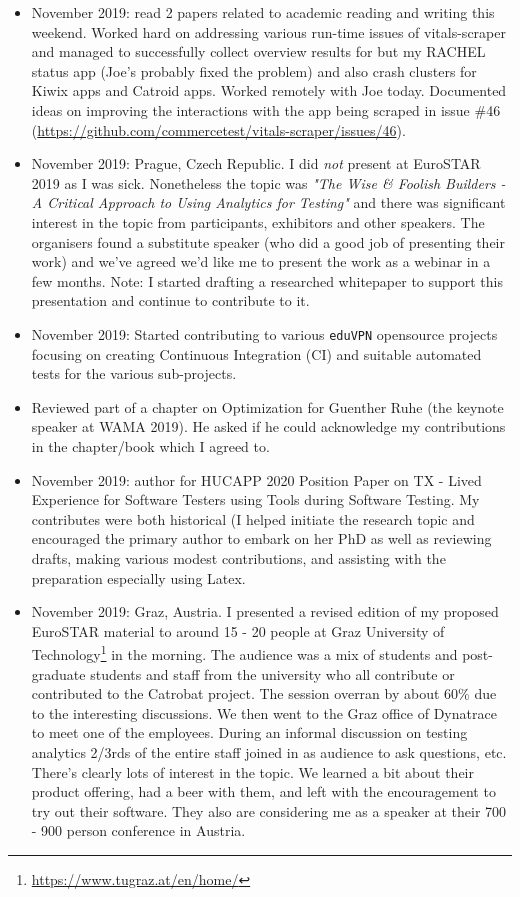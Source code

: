 \begin{itemize}
    \item {} November 2019: read 2 papers related to academic reading and writing this weekend. Worked hard on addressing various run-time issues of vitals-scraper and managed to successfully collect overview results for but my RACHEL status app (Joe's probably fixed the problem) and also crash clusters for Kiwix apps and Catroid apps. Worked remotely with Joe today. Documented ideas on improving the interactions with the app being scraped in issue \#46 (\url{https://github.com/commercetest/vitals-scraper/issues/46}).
    \item {} November 2019: Prague, Czech Republic. I did \emph{not} present at EuroSTAR 2019 as I was sick. Nonetheless the topic was \emph{"The Wise \& Foolish Builders - A Critical Approach to Using Analytics for Testing"} and there was significant interest in the topic from participants, exhibitors and other speakers. The organisers found a substitute speaker (who did a good job of presenting their work) and we've agreed we'd like me to present the work as a webinar in a few months. Note: I started drafting a researched whitepaper to support this presentation and continue to contribute to it.
    \item November 2019: Started contributing to various \texttt{eduVPN} opensource projects focusing on creating Continuous Integration (CI) and suitable automated tests for the various sub-projects. 
    \item Reviewed part of a chapter on Optimization for Guenther Ruhe (the keynote speaker at WAMA 2019). He asked if he could acknowledge my contributions in the chapter/book which I agreed to.
    \item November 2019:  author for HUCAPP 2020 Position Paper on TX - Lived Experience for Software Testers using Tools during Software Testing. My contributes were both historical (I helped initiate the research topic and encouraged the primary author to embark on her PhD as well as reviewing drafts, making various modest contributions, and assisting with the preparation especially using Latex.
    \item {} November 2019: Graz, Austria. I presented a revised edition of my proposed EuroSTAR material to around 15 - 20 people at Graz University of Technology\footnote{\url{https://www.tugraz.at/en/home/}} in the morning. The audience was a mix of students and post-graduate students and staff from the university who all contribute or contributed to the Catrobat project. The session overran by about 60\% due to the interesting discussions. We then went to the Graz office of Dynatrace to meet one of the employees. During an informal discussion on testing analytics 2/3rds of the entire staff joined in as audience to ask questions, etc. There's clearly lots of interest in the topic. We learned a bit about their product offering, had a beer with them, and left with the encouragement to try out their software. They also are considering me as a speaker at their 700 - 900 person conference in Austria.

\end{itemize}
